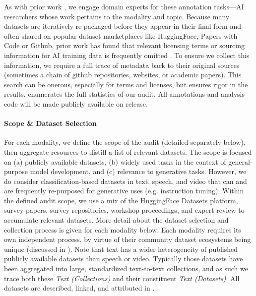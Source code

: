 As with prior work \citep{longpre2023data,longpre2024consent}, we engage domain experts for these annotation tasks---AI researchers whose work pertains to the modality and topic.
Because many datasets are iteratively re-packaged before they appear in their final form and often shared on popular dataset marketplaces like HuggingFace, Papers with Code or Github, prior work has found that relevant licensing terms or sourcing information for AI training data is frequently omitted \citep{longpre2023data}.
To ensure we collect this information, we require a full trace of metadata back to their original sources (sometimes a chain of github repositories, websites, or academic papers).
This search can be onerous, especially for terms and licenses, but ensures rigor in the results.
 enumerates the full statistics of our audit.
All annotations and analysis code will be made publicly available on release.

\vspace{-2mm}
\paragraph{Scope \& Dataset Selection}
For each modality, we define the scope of the audit (detailed separately below), then aggregate resources to distill a list of relevant datasets.
The scope is focused on (a) publicly available datasets, (b) widely used tasks in the context of general-purpose model development, and (c) relevance to generative tasks.
However, we do consider classification-based datasets in text, speech, and video that can and are frequently re-purposed for generative uses (e.g. instruction tuning).
Within the defined audit scope, we use a mix of the HuggingFace Datasets platform, survey papers, survey repositories, workshop proceedings, and expert review to accumulate relevant datasets. More detail about the dataset selection and collection process is given for each modality below.
Each modality requires its own independent process, by virtue of their community dataset ecosystems being unique (discussed in ).
Note that text has a wider heterogeneity of published publicly available datasets than speech or video.
Typically those datasets have been aggregated into large, standardized text-to-text collections, and as such we trace both these \emph{Text (Collections)} and their constituent \emph{Text (Datasets)}.
All datasets are described, linked, and attributed in .

\vspace{-2mm}
